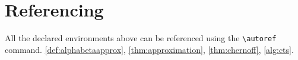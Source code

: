 \section*{Referencing}

All the declared environments above can be referenced using the \texttt{{\textbackslash autoref}} command. \autoref{def:alphabetaapprox}, \autoref{thm:approximation}, \autoref{thm:chernoff}, \autoref{alg:cts}.
